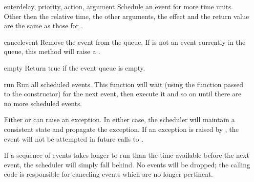 \begin{methoddesc}{enter}{delay, priority, action, argument}
Schedule an event for  more time units. Other then the
relative time, the other arguments, the effect and the return value
are the same as those for .
\end{methoddesc}

\begin{methoddesc}{cancel}{event}
Remove the event from the queue. If  is not an event
currently in the queue, this method will raise a
.
\end{methoddesc}

\begin{methoddesc}{empty}{}
Return true if the event queue is empty.
\end{methoddesc}

\begin{methoddesc}{run}{}
Run all scheduled events. This function will wait 
(using the  function passed to the constructor)
for the next event, then execute it and so on until there are no more
scheduled events.

Either  or  can raise an exception.  In
either case, the scheduler will maintain a consistent state and
propagate the exception.  If an exception is raised by ,
the event will not be attempted in future calls to .

If a sequence of events takes longer to run than the time available
before the next event, the scheduler will simply fall behind.  No
events will be dropped; the calling code is responsible for canceling 
events which are no longer pertinent.
\end{methoddesc}
